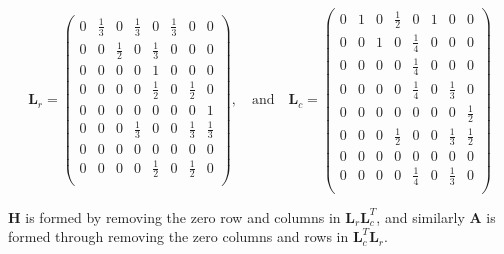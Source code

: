 \documentclass[11pt]{report}
\begin{document}
\begin{equation*}
\textbf{L}_r=\left(
\begin{array}{cccccccc}
0 & \frac{1}{3} & 0 & \frac{1}{3} & 0 & \frac{1}{3} & 0 & 0 \\
0 & 0 & \frac{1}{2} & 0 & \frac{1}{3} & 0 & 0 & 0 \\
0 & 0 & 0 & 0 & 1 & 0 & 0 & 0\\
0 & 0 & 0 & 0 & \frac{1}{2} & 0 & \frac{1}{2} & 0 \\
0 & 0 & 0 & 0 & 0 & 0 & 0 & 1 \\
0 & 0 & 0 & \frac{1}{3} & 0 & 0 & \frac{1}{3} & \frac{1}{3} \\
0 & 0 & 0 & 0 & 0 & 0 & 0 & 0 \\
0 & 0 & 0 & 0 & \frac{1}{2} & 0 & \frac{1}{2} & 0 \\
\end{array}
\right)
\mathrm{,}\quad\mathrm{and}\quad
\textbf{L}_c=\left(
\begin{array}{cccccccc}
0 & 1 & 0 & \frac{1}{2} & 0 & 1 & 0 & 0 \\
0 & 0 & 1 & 0 & \frac{1}{4} & 0 & 0 & 0 \\
0 & 0 & 0 & 0 & \frac{1}{4} & 0 & 0 & 0 \\
0 & 0 & 0 & 0 & \frac{1}{4} & 0 & \frac{1}{3} & 0 \\
0 & 0 & 0 & 0 & 0 & 0 & 0 & \frac{1}{2} \\
0 & 0 & 0 & \frac{1}{2} & 0 & 0 & \frac{1}{3} & \frac{1}{2} \\
0 & 0 & 0 & 0 & 0 & 0 & 0 & 0 \\
0 & 0 & 0 & 0 & \frac{1}{4} & 0 & \frac{1}{3} & 0 \\
\end{array}
\right)
\end{equation*}

\textbf{H} is formed by removing the zero row and columns in $\textbf{L}_r\textbf{L}_c^T$, and similarly \textbf{A} is formed through removing the zero columns and rows in $\textbf{L}_c^T\textbf{L}_r$. 
\end{document}
